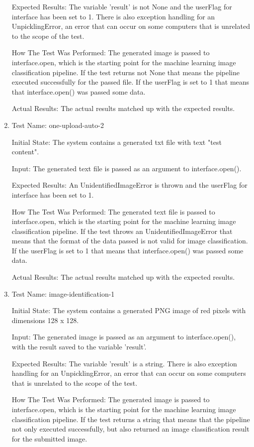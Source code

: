 \documentclass[12pt, titlepage]{article}
\begin{document}
\begin{enumerate}
		Expected Results: The variable 'result' is not None and the userFlag for interface has been set to 1. There is also exception handling for an UnpicklingError, an error that can occur on some computers that is unrelated to the scope of the test.
		
		How The Test Was Performed: The generated image is passed to interface.open, which is the starting point for the machine learning image classification pipeline. If the test returns not None that means the pipeline executed successfully for the passed file. If the userFlag is set to 1 that means that interface.open() was passed some data.
		
		Actual Results: The actual results matched up with the expected results.
        \item{Test Name: one-upload-auto-2}
		
		Initial State: The system contains a generated txt file with text "test content".
		
		Input: The generated text file is passed as an argument to interface.open().
		
		Expected Results: An UnidentifiedImageError is thrown and the userFlag for interface has been set to 1.
		
		How The Test Was Performed: The generated text file is passed to interface.open, which is the starting point for the machine learning image classification pipeline. If the test throws an UnidentifiedImageError that means that the format of the data passed is not valid for image classification. If the userFlag is set to 1 that means that interface.open() was passed some data.
		
		Actual Results: The actual results matched up with the expected results. 
        \item{Test Name: image-identification-1}
		
		Initial State: The system contains a generated PNG image of red pixels with dimensions 128 x 128.
		
		Input: The generated image is passed as an argument to interface.open(), with the result saved to the variable 'result'.
		
		Expected Results: The variable 'result' is a string. There is also exception handling for an UnpicklingError, an error that can occur on some computers that is unrelated to the scope of the test.
		
		How The Test Was Performed: The generated image is passed to interface.open, which is the starting point for the machine learning image classification pipeline. If the test returns a string that means that the pipeline not only executed successfully, but also returned an image classification result for the submitted image.
		

\end{enumerate}
\end{document}
